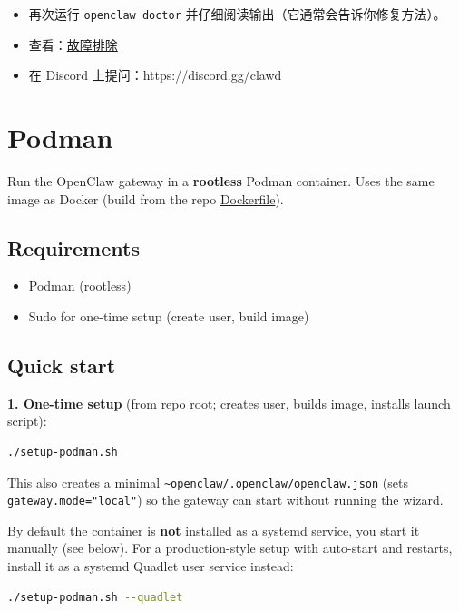 \begin{itemize}
  \item 再次运行 \texttt{openclaw doctor} 并仔细阅读输出（它通常会告诉你修复方法）。
  \item 查看：\href{/gateway/troubleshooting}{故障排除}
  \item 在 Discord 上提问：https://discord.gg/clawd
\end{itemize}



\clearpage
\section{Podman}


Run the OpenClaw gateway in a \textbf{rootless} Podman container. Uses the same image as Docker (build from the repo \href{https://github.com/openclaw/openclaw/blob/main/Dockerfile}{Dockerfile}).

\subsection{Requirements}


\begin{itemize}
  \item Podman (rootless)
  \item Sudo for one-time setup (create user, build image)
\end{itemize}


\subsection{Quick start}


\textbf{1. One-time setup} (from repo root; creates user, builds image, installs launch script):

\begin{lstlisting}[language=bash]
./setup-podman.sh
\end{lstlisting}


This also creates a minimal \texttt{\textasciitilde{}openclaw/.openclaw/openclaw.json} (sets \texttt{gateway.mode="local"}) so the gateway can start without running the wizard.

By default the container is \textbf{not} installed as a systemd service, you start it manually (see below). For a production-style setup with auto-start and restarts, install it as a systemd Quadlet user service instead:

\begin{lstlisting}[language=bash]
./setup-podman.sh --quadlet
\end{lstlisting}


